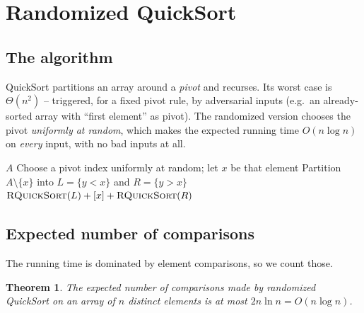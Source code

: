\documentclass[11pt]{article}
\newtheorem{theorem}{Theorem}[section]
\begin{document}
\section{Randomized QuickSort}

\subsection{The algorithm}

QuickSort partitions an array around a \emph{pivot} and recurses. Its worst case
is $\Theta(n^2)$ -- triggered, for a fixed pivot rule, by adversarial inputs (e.g.\
an already-sorted array with ``first element'' as pivot). The randomized version
chooses the pivot \emph{uniformly at random}, which makes the expected running time
$O(n \log n)$ on \emph{every} input, with no bad inputs at all.

\begin{algorithm}[h]
\caption{Randomized QuickSort}
\begin{algorithmic}[1]
     \Return $A$ \EndIf
    \State Choose a pivot index uniformly at random; let $x$ be that element
    \State Partition $A \setminus \{x\}$ into $L = \{y < x\}$ and $R = \{y > x\}$
    \State \Return $\textsc{RQuickSort}(L) \mathbin{+} [x] \mathbin{+} \textsc{RQuickSort}(R)$
\EndFunction
\end{algorithmic}
\end{algorithm}

\subsection{Expected number of comparisons}

The running time is dominated by element comparisons, so we count those.

\begin{theorem}
\label{thm:quicksort}
The expected number of comparisons made by randomized QuickSort on an array of $n$
distinct elements is at most $2n \ln n = O(n \log n)$.
\end{theorem}
\end{document}
